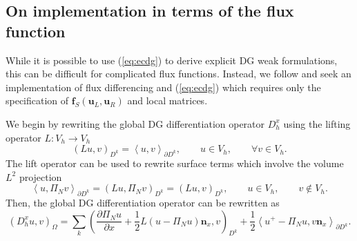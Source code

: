 \documentclass[preprint,10pt]{article}
\theoremstyle{definition}
\theoremstyle{lemma}
\theoremstyle{theorem}
\theoremstyle{assumption}
\newcommand{\pd}[2]{\frac{\partial#1}{\partial#2}}
\newcommand{\LRp}[1]{\left( #1 \right)}
\newcommand{\LRa}[1]{\left\langle #1 \right\rangle}
\begin{document}
\subsection{On implementation in terms of the flux function}
\label{sec:implementation}
While it is possible to use (\ref{eq:ecdg}) to derive explicit DG weak formulations, this can be difficult for complicated flux functions.  Instead, we follow \cite{gassner2016split, chen2017entropy} and seek an implementation of flux differencing and (\ref{eq:ecdg}) which requires only the specification of $\bm{f}_S(\bm{u}_L,\bm{u}_R)$ and local matrices.  

We begin by rewriting the global DG differentiation operator $D^x_h$ using the lifting operator  ${L}: V_h \rightarrow V_h$ \cite{hesthaven2007nodal, di2011mathematical}
\[
\LRp{{L} u,v}_{D^k} = \LRa{u,v}_{\partial D^k}, \qquad u \in V_h, \qquad \forall v\in V_h.
\]
The lift operator can be used to rewrite surface terms which involve the volume $L^2$ projection
\[
\LRa{u,\Pi_Nv}_{\partial D^k} = \LRp{Lu,\Pi_N v}_{D^k} = \LRp{Lu,v}_{D^k}, \qquad u\in V_h, \qquad v\not\in V_h.  
\]
Then, the global DG differentiation operator can be rewritten as 
\begin{equation}
\LRp{D^x_h u,v}_{\Omega} = \sum_k \LRp{\pd{ \Pi_N u}{x} + \frac{1}{2}L\LRp{u-\Pi_N u}\bm{n}_x,v}_{D^k} + \frac{1}{2}{\LRa{{u^+ - \Pi_N u}, v\bm{n}_x}_{\partial D^k}}.
\label{eq:dgd_globalimplement}
\end{equation}
\end{document}

